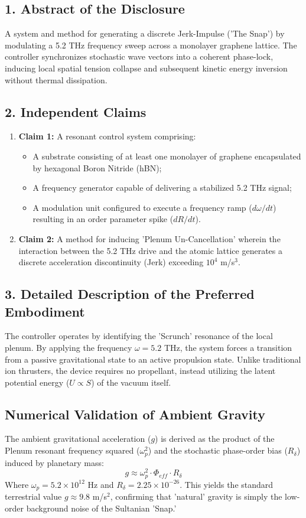 \documentclass[11pt]{article}
\begin{document}
\subsection*{1. Abstract of the Disclosure}
A system and method for generating a discrete Jerk-Impulse ('The Snap') by modulating a 5.2 THz frequency sweep across a monolayer graphene lattice. The controller synchronizes stochastic wave vectors into a coherent phase-lock, inducing local spatial tension collapse and subsequent kinetic energy inversion without thermal dissipation.

\subsection*{2. Independent Claims}
\begin{enumerate}
    \item \textbf{Claim 1:} A resonant control system comprising:
    \begin{itemize}
        \item A substrate consisting of at least one monolayer of graphene encapsulated by hexagonal Boron Nitride (hBN);
        \item A frequency generator capable of delivering a stabilized 5.2 THz signal;
        \item A modulation unit configured to execute a frequency ramp ($d\omega/dt$) resulting in an order parameter spike ($dR/dt$).
    \end{itemize}
    \item \textbf{Claim 2:} A method for inducing 'Plenum Un-Cancellation' wherein the interaction between the 5.2 THz drive and the atomic lattice generates a discrete acceleration discontinuity (Jerk) exceeding $10^4$ m/s$^3$.
\end{enumerate}

\subsection*{3. Detailed Description of the Preferred Embodiment}
The controller operates by identifying the 'Scrunch' resonance of the local plenum. By applying the frequency $\omega = 5.2$ THz, the system forces a transition from a passive gravitational state to an active propulsion state. Unlike traditional ion thrusters, the device requires no propellant, instead utilizing the latent potential energy ($U \propto S$) of the vacuum itself.

\subsection*{Numerical Validation of Ambient Gravity}
The ambient gravitational acceleration ($g$) is derived as the product of the Plenum resonant frequency squared ($\omega_p^2$) and the stochastic phase-order bias ($R_{\delta}$) induced by planetary mass:
\begin{equation}
    g \approx \omega_p^2 \cdot \Phi_{eff} \cdot R_{\delta}
\end{equation}
Where $\omega_p = 5.2 \times 10^{12}$ Hz and $R_{\delta} = 2.25 \times 10^{-26}$. This yields the standard terrestrial value $g \approx 9.8$ m/s$^2$, confirming that 'natural' gravity is simply the low-order background noise of the Sultanian 'Snap.'
\end{document}
